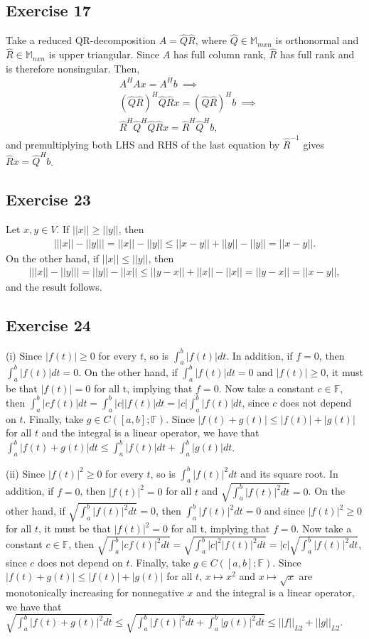 \documentclass[11.5pt, letterpaper, bibtotoc,
    tablecaptionabove, figurecaptionabove]{article}
\begin{document}
\subsection*{Exercise 17}
Take a reduced QR-decomposition $A=\hat{Q}\hat{R}$,
where $\hat{Q}\in\mathbb M_{mxn}$ is orthonormal and $\hat{R}\in\mathbb M_{nxn}$ is upper triangular.
Since $A$ has full column rank, $\hat{R}$ has full rank and is therefore nonsingular.
Then,
\begin{align*}
    &A^HAx=A^Hb\ \implies\\ 
    &(\hat{Q}\hat{R})^H\hat{Q}\hat{R}x = (\hat{Q}\hat{R})^Hb\ \implies\\
    &\hat{R}^H\hat{Q}^H\hat{Q}\hat{R}x = \hat{R}^H\hat{Q}^Hb,
\end{align*}
and premultiplying both LHS and RHS of the last equation by $\hat{R}^{-1}$ gives
$\hat{R}x = \hat{Q}^Hb$.

\subsection*{Exercise 23}
Let $x,y\in V$.
If $||x||\geq||y||$, then 
\begin{align*}
    \left| ||x||-||y||\right|=
    ||x||-||y||\leq
    ||x-y||+||y||-||y||=
    ||x-y||.
\end{align*}
On the other hand, if $||x||\leq||y||$, then
\begin{align*}
    \left| ||x||-||y||\right|=
    ||y||-||x||\leq
    ||y-x||+||x||-||x||=
    ||y-x||=||x-y||,
\end{align*}
and the result follows.

\subsection*{Exercise 24}
(i)
Since $|f(t)|\geq 0$ for every $t$, so is $\int_a^b|f(t)|dt$.
In addition, if $f=0$, then $\int_a^b|f(t)|dt=0$.
On the other hand, if $\int_a^b|f(t)|dt=0$ and $|f(t)|\geq 0$, it must be that
$|f(t)|=0$ for all t, implying that $f=0$.
Now take a constant $c\in\mathbb F$, then 
$\int_a^b|cf(t)|dt=\int_a^b|c||f(t)|dt=|c|\int_a^b|f(t)|dt$,
since $c$ does not depend on $t$.
Finally, take $g\in C([a, b]; \mathbb F)$.
Since $|f(t)+g(t)|\leq|f(t)|+|g(t)|$ for all $t$ and the integral is a linear operator,
we have that $\int_a^b|f(t)+g(t)|dt\leq\int_a^b|f(t)|dt + \int_a^b|g(t)|dt$.

(ii)
Since $|f(t)|^2\geq 0$ for every $t$, so is $\int_a^b|f(t)|^2dt$ and its square root.
In addition, if $f=0$, then $|f(t)|^2=0$ for all $t$ and $\sqrt{\int_a^b|f(t)|^2dt}=0$.
On the other hand, if $\sqrt{\int_a^b|f(t)|^2dt}=0$, 
then $\int_a^b|f(t)|^2dt=0$ and since $|f(t)|^2\geq 0$ for all $t$, 
it must be that $|f(t)|^2=0$ for all t, implying that $f=0$.
Now take a constant $c\in\mathbb F$, then 
$\sqrt{\int_a^b|cf(t)|^2dt}=\sqrt{\int_a^b|c|^2|f(t)|^2dt}=|c|\sqrt{\int_a^b|f(t)|^2dt}$,
since $c$ does not depend on $t$.
Finally, take $g\in C([a, b]; \mathbb F)$.
Since $|f(t)+g(t)|\leq|f(t)|+|g(t)|$ for all $t$, 
$x\mapsto x^2$ and $x\mapsto\sqrt{x}$ are monotonically increasing for nonnegative $x$ 
and the integral is a linear operator,
we have that $\sqrt{\int_a^b|f(t)+g(t)|^2dt}\leq\sqrt{\int_a^b|f(t)|^2dt + \int_a^b|g(t)|^2dt}
\leq||f||_{L2}+||g||_{L2}$.
\end{document}
